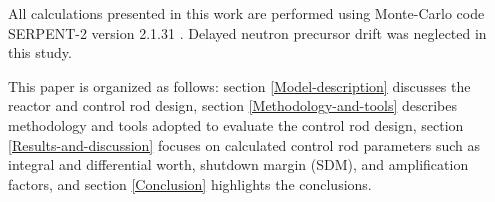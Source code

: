 All calculations presented in this work are performed using Monte-Carlo code SERPENT-2 version 2.1.31 \cite{leppanen2014serpent}. Delayed neutron precursor drift was neglected in this study.

This paper is organized as follows: section \ref{Model-description} discusses the reactor and control rod design, section \ref{Methodology-and-tools} describes methodology and tools adopted to evaluate the control rod design, section \ref{Results-and-discussion} focuses on calculated control rod parameters such as integral and differential worth, shutdown margin (SDM), and amplification factors, and section \ref{Conclusion} highlights the conclusions.